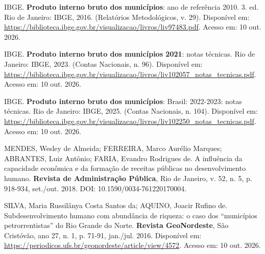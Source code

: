 \documentclass[12pt,a4paper]{article}
\newenvironment{referencias}{\begin{singlespace}\setlength{\parindent}{0pt}\setlength{\parskip}{4pt}\raggedright\footnotesize}{\end{singlespace}}
\begin{document}
\begin{referencias}
IBGE. \textbf{Produto interno bruto dos municípios}: ano de referência 2010. 3. ed. Rio de Janeiro: IBGE, 2016. (Relatórios Metodológicos, v. 29). Disponível em: \url{https://biblioteca.ibge.gov.br/visualizacao/livros/liv97483.pdf}. Acesso em: 10 out. 2026.

IBGE. \textbf{Produto interno bruto dos municípios 2021}: notas técnicas. Rio de Janeiro: IBGE, 2023. (Contas Nacionais, n. 96). Disponível em: \url{https://biblioteca.ibge.gov.br/visualizacao/livros/liv102057_notas_tecnicas.pdf}. Acesso em: 10 out. 2026.

IBGE. \textbf{Produto interno bruto dos municípios}: Brasil: 2022-2023: notas técnicas. Rio de Janeiro: IBGE, 2025. (Contas Nacionais, n. 104). Disponível em: \url{https://biblioteca.ibge.gov.br/visualizacao/livros/liv102250_notas_tecnicas.pdf}. Acesso em: 10 out. 2026.

MENDES, Wesley de Almeida; FERREIRA, Marco Aurélio Marques; ABRANTES, Luiz Antônio; FARIA, Evandro Rodrigues de. A influência da capacidade econômica e da formação de receitas públicas no desenvolvimento humano. \textbf{Revista de Administração Pública}, Rio de Janeiro, v. 52, n. 5, p. 918-934, set./out. 2018. DOI: 10.1590/0034-761220170004.


SILVA, Maria Russilânya Costa Santos da; AQUINO, Joacir Rufino de. Subdesenvolvimento humano com abundância de riqueza: o caso dos ``municípios petrorrentistas'' do Rio Grande do Norte. \textbf{Revista GeoNordeste}, São Cristóvão, ano 27, n. 1, p. 71-91, jan./jul. 2016. Disponível em: \url{https://periodicos.ufs.br/geonordeste/article/view/4572}. Acesso em: 10 out. 2026.

\end{referencias}
\end{document}
